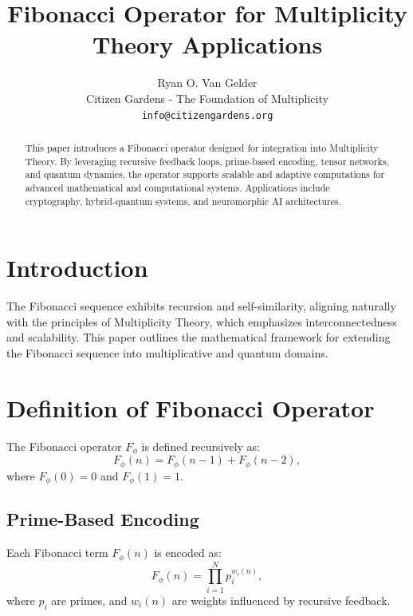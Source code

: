 \documentclass{article}
\theoremstyle{plain}
\begin{document}
\title{Fibonacci Operator for Multiplicity Theory Applications}

\author{Ryan O. Van Gelder \\
Citizen Gardens - The Foundation of Multiplicity \\
\texttt{info@citizengardens.org}}

\maketitle

\begin{abstract}
This paper introduces a Fibonacci operator designed for integration into Multiplicity Theory. By leveraging recursive feedback loops, prime-based encoding, tensor networks, and quantum dynamics, the operator supports scalable and adaptive computations for advanced mathematical and computational systems. Applications include cryptography, hybrid-quantum systems, and neuromorphic AI architectures.
\end{abstract}

\section{Introduction}

The Fibonacci sequence exhibits recursion and self-similarity, aligning naturally with the principles of Multiplicity Theory, which emphasizes interconnectedness and scalability. This paper outlines the mathematical framework for extending the Fibonacci sequence into multiplicative and quantum domains.

\section{Definition of Fibonacci Operator}

\begin{definition}
The Fibonacci operator \( F_\phi \) is defined recursively as:
\[
F_\phi(n) = F_\phi(n-1) + F_\phi(n-2),
\]
where \( F_\phi(0) = 0 \) and \( F_\phi(1) = 1 \).
\end{definition}

\subsection{Prime-Based Encoding}
Each Fibonacci term \( F_\phi(n) \) is encoded as:
\[
F_\phi(n) = \prod_{i=1}^{N} p_i^{w_i(n)},
\]
where \( p_i \) are primes, and \( w_i(n) \) are weights influenced by recursive feedback.
\end{document}
